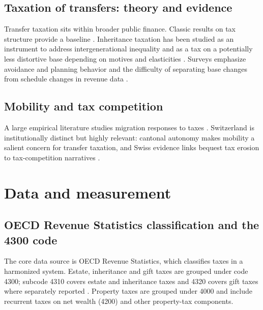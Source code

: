 \documentclass[11pt,a4paper]{article}
\begin{document}
\subsection{Taxation of transfers: theory and evidence}
Transfer taxation sits within broader public finance. Classic results on tax structure provide a baseline \parencite{AtkinsonStiglitz1976,Mirrlees2011}. Inheritance taxation has been studied as an instrument to address intergenerational inequality and as a tax on a potentially less distortive base depending on motives and elasticities \parencite{PikettySaez2013,FarhiWerning2013}. Surveys emphasize avoidance and planning behavior and the difficulty of separating base changes from schedule changes in revenue data \parencite{Kopczuk2009,CremerPestieau2011}.

\subsection{Mobility and tax competition}
A large empirical literature studies migration responses to taxes \parencite{KlevenLandaisSaez2013,YoungVarner2011,MorettiWilson2017}. Switzerland is institutionally distinct but highly relevant: cantonal autonomy makes mobility a salient concern for transfer taxation, and Swiss evidence links bequest tax erosion to tax-competition narratives \parencite{BrulhartParchet2014}.

\section{Data and measurement}
\label{sec:data}

\subsection{OECD Revenue Statistics classification and the 4300 code}
The core data source is OECD Revenue Statistics, which classifies taxes in a harmonized system. Estate, inheritance and gift taxes are grouped under code 4300; subcode 4310 covers estate and inheritance taxes and 4320 covers gift taxes where separately reported \parencite{OECDInterpretativeGuide,OECDRevenueStatsGuide}. Property taxes are grouped under 4000 and include recurrent taxes on net wealth (4200) and other property-tax components.
\end{document}
